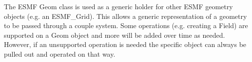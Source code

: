 %

The ESMF Geom class is used as a generic holder for other ESMF geometry objects (e.g. an ESMF\_Grid). This allows a generic
representation of a geometry to be passed through a couple system. Some operations (e.g. creating a Field) are supported on
a Geom object and more will be added over time as needed. However, if an unsupported operation is needed the specific object
can always be pulled out and operated on that way.

